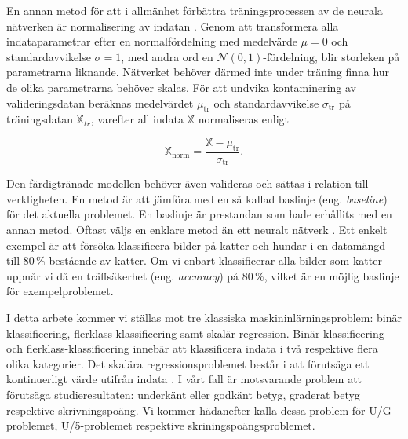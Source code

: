 En annan metod för att i allmänhet förbättra träningsprocessen av de neurala nätverken är normalisering av indatan \cite{Chollet}. Genom att transformera alla indataparametrar efter en normalfördelning med medelvärde $\mu = 0$ och standardavvikelse $\sigma = 1$, med andra ord en $\mathcal{N}(0,1)\text{-fördelning}$, blir storleken på parametrarna liknande. Nätverket behöver därmed inte under träning finna hur de olika parametrarna behöver skalas. För att undvika kontaminering av valideringsdatan beräknas medelvärdet $\mu_\mathrm{tr}$ och standardavvikelse $\sigma_\mathrm{tr}$ på träningsdatan $\mathbb{X}_{tr}$, varefter all indata $\mathbb{X}$ normaliseras enligt 

\begin{equation}
    \mathbb{X}_\mathrm{norm} = \frac{\mathbb{X}-\mu_\mathrm{tr}}{\sigma_\mathrm{tr}}.
    \label{normalization}
\end{equation}

Den färdigtränade modellen behöver även valideras och sättas i relation till verkligheten. En metod är att jämföra med en så kallad baslinje (eng. \emph{baseline}) för det aktuella problemet. En baslinje är prestandan som hade erhållits med en annan metod. Oftast väljs en enklare metod än ett neuralt nätverk \cite{Chollet}. Ett enkelt exempel är att försöka klassificera bilder på katter och hundar i en datamängd till 80\,\% bestående av katter. Om vi enbart klassificerar alla bilder som katter uppnår vi då en träffsäkerhet (eng. \emph{accuracy}) på 80\,\%, vilket är en möjlig baslinje för exempelproblemet.

I detta arbete kommer vi ställas mot tre klassiska maskininlärningsproblem: binär klassificering, flerklass-klassificering samt skalär regression. Binär klassificering och flerklass-klassificering innebär att klassificera indata i två respektive flera olika kategorier. Det skalära regressionsproblemet består i att förutsäga ett kontinuerligt värde utifrån indata \cite{Chollet}. I vårt fall är motsvarande problem att förutsäga studieresultaten: underkänt eller godkänt betyg, graderat betyg respektive skrivningspoäng. Vi kommer hädanefter kalla dessa problem för U/G-problemet, U/5-problemet respektive skriningspoängsproblemet.

